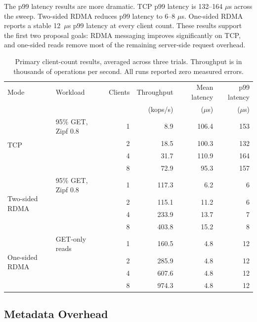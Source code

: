 \documentclass[letterpaper,twocolumn,10pt]{article}
\begin{document}
The p99 latency results are more dramatic.  TCP p99 latency is 132--164
$\mu$s across the sweep.  Two-sided RDMA reduces p99 latency to 6--8
$\mu$s.  One-sided RDMA reports a stable 12~$\mu$s p99 latency at every
client count.  These results support the first two proposal goals: RDMA
messaging improves significantly on TCP, and one-sided reads remove most of
the remaining server-side request overhead.

\begin{table}[t]
\centering
\caption{Primary client-count results, averaged across three trials.
Throughput is in thousands of operations per second.  All runs reported zero
measured errors.}
\label{tab:primary-results}
\begin{tabular}{llrrrr}
\toprule
Mode & Workload & Clients & Throughput & Mean latency & p99 latency \\
     &          &         & (kops/s)   & ($\mu$s)     & ($\mu$s) \\
\midrule
\multirow{4}{*}{TCP} & 95\% GET, Zipf 0.8 & 1 & 8.9  & 106.4 & 153 \\
                     &                     & 2 & 18.5 & 100.3 & 132 \\
                     &                     & 4 & 31.7 & 110.9 & 164 \\
                     &                     & 8 & 72.9 & 95.3  & 157 \\
\midrule
\multirow{4}{*}{Two-sided RDMA} & 95\% GET, Zipf 0.8 & 1 & 117.3 & 6.2  & 6 \\
                                &                     & 2 & 115.1 & 11.2 & 6 \\
                                &                     & 4 & 233.9 & 13.7 & 7 \\
                                &                     & 8 & 403.8 & 15.2 & 8 \\
\midrule
\multirow{4}{*}{One-sided RDMA} & GET-only reads & 1 & 160.5 & 4.8 & 12 \\
                                &                & 2 & 285.9 & 4.8 & 12 \\
                                &                & 4 & 607.6 & 4.8 & 12 \\
                                &                & 8 & 974.3 & 4.8 & 12 \\
\bottomrule
\end{tabular}
\end{table}

\subsection{Metadata Overhead}
\end{document}

